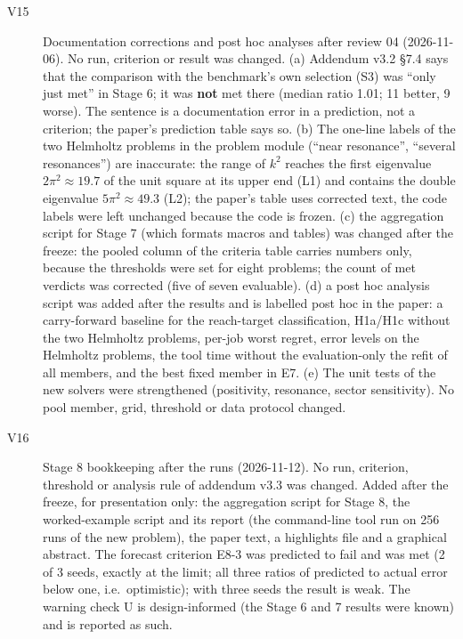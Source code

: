 \begin{description}
\item[V15] Documentation corrections and post hoc analyses after review 04 (2026-11-06). No run, criterion or result was changed. (a) Addendum v3.2 §7.4 says that the comparison with the benchmark's own selection (S3) was ``only just met'' in Stage 6; it was \textbf{not} met there (median ratio 1.01; 11 better, 9 worse). The sentence is a documentation error in a prediction, not a criterion; the paper's prediction table says so. (b) The one-line labels of the two Helmholtz problems in the problem module (``near resonance'', ``several resonances'') are inaccurate: the range of \(k^2\) reaches the first eigenvalue \(2\pi^2\approx 19.7\) of the unit square at its upper end (L1) and contains the double eigenvalue \(5\pi^2\approx 49.3\) (L2); the paper's table uses corrected text, the code labels were left unchanged because the code is frozen. (c) the aggregation script for Stage 7 (which formats macros and tables) was changed after the freeze: the pooled column of the criteria table carries numbers only, because the thresholds were set for eight problems; the count of met verdicts was corrected (five of seven evaluable). (d) a post hoc analysis script was added after the results and is labelled post hoc in the paper: a carry-forward baseline for the reach-target classification, H1a/H1c without the two Helmholtz problems, per-job worst regret, error levels on the Helmholtz problems, the tool time without the evaluation-only the refit of all members, and the best fixed member in E7. (e) The unit tests of the new solvers were strengthened (positivity, resonance, sector sensitivity). No pool member, grid, threshold or data protocol changed.
\item[V16] Stage 8 bookkeeping after the runs (2026-11-12). No run, criterion, threshold or analysis rule of addendum v3.3 was changed. Added after the freeze, for presentation only: the aggregation script for Stage 8, the worked-example script and its report (the command-line tool run on 256 runs of the new problem), the paper text, a highlights file and a graphical abstract. The forecast criterion E8-3 was predicted to fail and was met (2 of 3 seeds, exactly at the limit; all three ratios of predicted to actual error below one, i.e.~optimistic); with three seeds the result is weak. The warning check U is design-informed (the Stage 6 and 7 results were known) and is reported as such.

\end{description}
